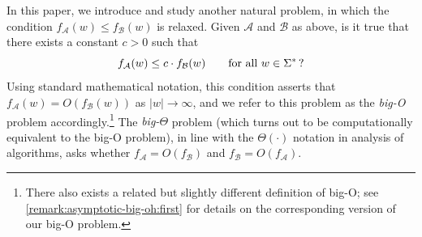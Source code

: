 \documentclass{lmcs}
\theoremstyle{plain}
\theoremstyle{definition}
\theoremstyle{remark}
\begin{document}
In this paper, we introduce and study another natural problem,
in which the condition $f_{\mathcal A}(w) \le f_{\mathcal B}(w)$ 
is relaxed.
Given $\mathcal A$ and $\mathcal B$ as above,
is it true that there exists a constant $c > 0$ such that
\begin{equation*}
f_{\mathcal A}(w) \le c \cdot f_{\mathcal B}(w)
\qquad
\text{for all $w \in \Sigma^*$\,?}
\end{equation*}
Using standard mathematical notation, this condition asserts
that $f_{\mathcal A}(w) = O(f_{\mathcal B}(w))$ as $|w| \to \infty$,
and we refer to this problem as the \emph{big-O} problem accordingly.\footnote{There also exists a related but slightly different definition of big-O;
          see \cref{remark:asymptotic-big-oh:first} for details on the corresponding
          version of our big-O problem.}
The \emph{big-$\Theta$} problem
(which turns out to be computationally equivalent to the big-O problem),
in line with the $\Theta(\cdot)$ notation in analysis of algorithms,
asks whether $f_{\mathcal A} = O(f_{\mathcal B})$ and
$f_{\mathcal B} = O(f_{\mathcal A})$.
\end{document}
